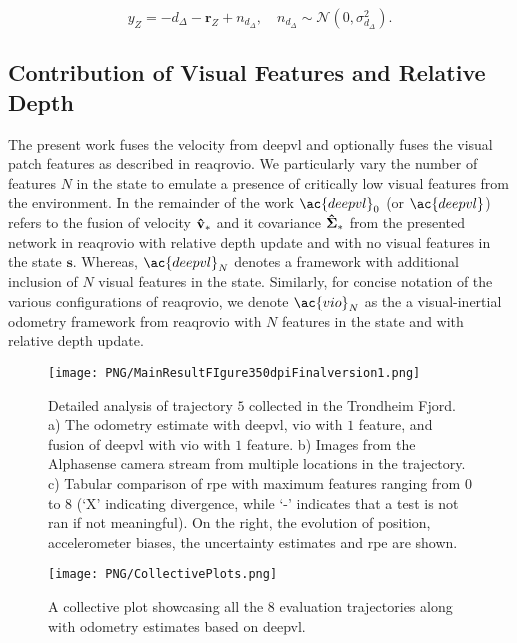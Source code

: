 \begin{equation}
    y_{Z} = -d_{\Delta}-\mathbf{r}_{Z} + n_{d_{\Delta}},\quad n_{d_{\Delta}}\sim\mathcal{N}(0, \sigma_{d_\Delta}^2).
\end{equation}

\subsection{Contribution of Visual Features and Relative Depth}
The present work fuses the velocity from \ac{deepvl} and optionally fuses the visual patch features as described in \ac{reaqrovio}. We particularly vary the number of features $N$ in the state to emulate a presence of critically low visual features from the environment. In the remainder of the work $\ac{deepvl}_{0}$ (or $\ac{deepvl}$) refers to the fusion of velocity $\mathbf{\hat{v}}_{*}$ and it covariance $\mathbf{\hat{\Sigma}}_{*}$ from the presented network in \ac{reaqrovio} with relative depth update and with no visual features in the state $\mathbf{s}$. Whereas, $\ac{deepvl}_{N}$ denotes a framework with additional inclusion of $N$ visual features in the state. Similarly, for concise notation of the various configurations of \ac{reaqrovio}, we denote $\ac{vio}_{N}$ as the a visual-inertial odometry framework from \ac{reaqrovio} with $N$ features in the state and with relative depth update.

\begin{figure*}[ht!]
\centering
    \texttt{[image: PNG/MainResultFIgure350dpiFinalversion1.png]}
\vspace{-2ex} 
\caption{Detailed analysis of trajectory $5$ collected in the Trondheim Fjord. a) The odometry estimate with \ac{deepvl}, \ac{vio} with $1$ feature, and fusion of \ac{deepvl} with \ac{vio} with $1$ feature. b) Images from the Alphasense camera stream from multiple locations in the trajectory. c) Tabular comparison of \ac{rpe} with maximum features ranging from $0$ to $8$ (`X' indicating divergence, while `-' indicates that a test is not ran if not meaningful). On the right, the evolution of position, accelerometer biases, the uncertainty estimates and \ac{rpe} are shown.}
\label{fig:detailed_results}
\vspace{-2ex} 
\end{figure*}

\begin{figure}
    \centering
    \texttt{[image: PNG/CollectivePlots.png]}
    \caption{A collective plot showcasing all the $8$ evaluation trajectories along with odometry estimates based on \ac{deepvl}.}
    \label{fig:collective_plot}
\end{figure}
